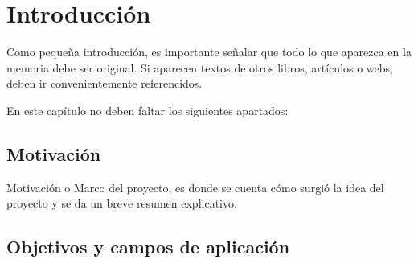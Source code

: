 \chapter{Introducción}

Como pequeña introducción, es importante señalar que todo lo que aparezca en la memoria debe ser original. Si aparecen textos de otros libros, artículos o webs, deben ir convenientemente referencidos.

En este capítulo no deben faltar los siguientes apartados:

\section{Motivación}

Motivación o Marco del proyecto, es donde se cuenta cómo surgió la idea del proyecto y se da un breve resumen explicativo.

\section{Objetivos y campos de aplicación}

